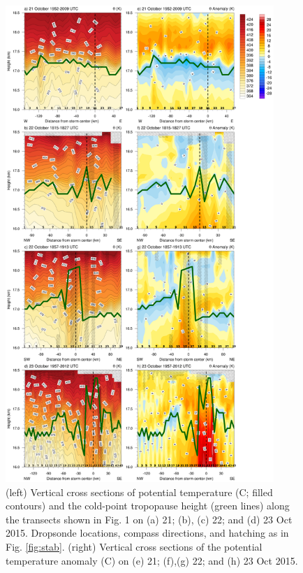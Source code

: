 \begin{figure}[ht]
\centerline{\includegraphics[width=24pc]{figures/fig05_theta+anomalies.png}}
\caption{(left) Vertical cross sections of potential temperature (\textdegree{}C; filled contours) and the cold-point tropopause height (green lines) along the transects shown in Fig. 1 on (a) 21; (b), (c) 22; and (d) 23 Oct 2015. Dropsonde locations, compass directions, and hatching as in Fig. \ref{fig:stab}. (right) Vertical cross sections of the potential temperature anomaly (\textdegree{}C) on (e) 21; (f),(g) 22; and (h) 23 Oct 2015.}
\label{fig:anomalies}
\end{figure}

